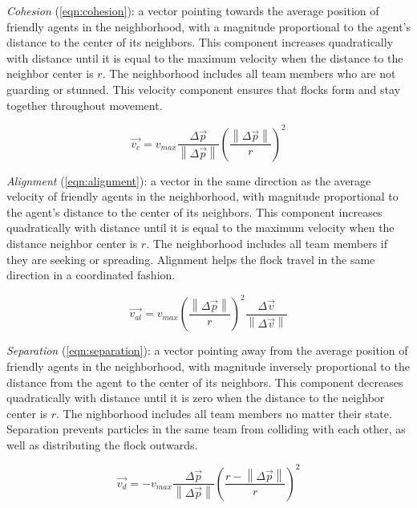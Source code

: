 \documentclass[conference,final]{IEEEtran}
\begin{document}
\textit{Cohesion} (\ref{eqn:cohesion}): a vector pointing towards the average position of friendly agents in the neighborhood, with a magnitude proportional to the agent's distance to the center of its neighbors. This component increases quadratically with distance until it is equal to the maximum velocity when the distance to the neighbor center is $r$. The neighborhood includes all team members who are not guarding or stunned. This velocity component ensures that flocks form and stay together throughout movement.

\begin{equation}
    \vec { v_{ c } } =v_{ max }\frac { \Delta  \vec { p }  }{ \left\|   \Delta \vec { p }  \right\|  } \left( \frac { \left\|  \Delta \vec {  p }  \right\|  }{ r }  \right) ^{ 2 }
    \label{eqn:cohesion}
\end{equation}

\textit{Alignment} (\ref{eqn:alignment}): a vector in the same direction as the average velocity of friendly agents in the neighborhood, with magnitude proportional to the agent's distance to the center of its neighbors. This component increases quadratically with distance until it is equal to the maximum velocity when the distance neighbor center is $r$. The neighborhood includes all team members if they are seeking or spreading. Alignment helps the flock travel in the same direction in a coordinated fashion.

\begin{equation}
    \vec { v_{ al } } =v_{ max }{\left( \frac { \left\| \Delta \vec { p } \right\|  }{ r }  \right)}^2\frac {\Delta \vec{v}} { \left\| \Delta \vec{v} \right\| }
    \label{eqn:alignment}
\end{equation}

\textit{Separation} (\ref{eqn:separation}): a vector pointing away from the average position of friendly agents in the neighborhood, with magnitude inversely proportional to the distance from the agent to the center of its neighbors. This component decreases quadratically with distance until it is zero when the distance to the neighbor center is $r$. The nighborhood includes all team members no matter their state. Separation prevents particles in the same team from colliding with each other, as well as distributing the flock outwards.

\begin{equation}
    \vec { v_{ d } } =-v_{ max }\frac {\Delta \vec{p}} { \left\| \Delta \vec{p} \right\| }{\left( \frac { r - \left\| \Delta \vec { p } \right\|  }{ r }  \right)}^2
    \label{eqn:separation}
\end{equation}
\end{document}
